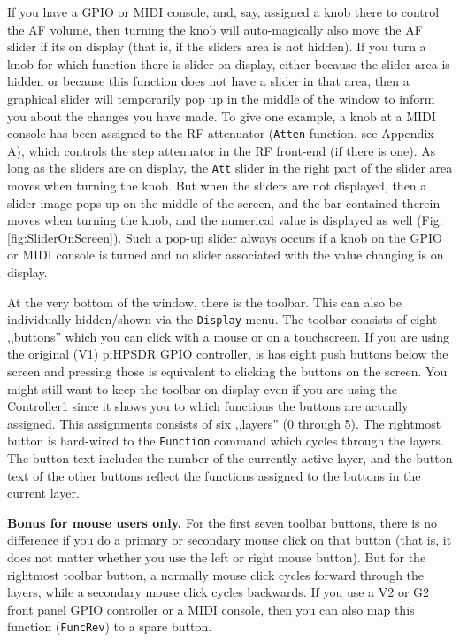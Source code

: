 \documentclass[12pt]{book}
\def\rett#1{\texttt{\color{red}#1}}
\def\bltt#1{\texttt{\color{blue}#1}}
\def\pH{pi\-HPSDR\xspace}
\begin{document}
If you have a GPIO or  MIDI  console, and, say, assigned
a knob there to control the AF volume, then turning the
knob will auto-magically also move the AF slider if its
on display (that is, if the sliders area is not hidden).
If you turn a knob for which function there is slider
on display, either because the slider area is hidden or
because this function does not have a slider in that area,
then a graphical slider will temporarily pop up in the
middle of the window to inform you about the changes
you have  made. To give one example, a knob at a
MIDI console has been assigned to the RF attenuator (\bltt{Atten}
function, see Appendix A), which controls the step
attenuator in the RF front-end (if there is one). As long
as the  sliders  are  on display, the \rett{Att} slider
in the right part of the slider area moves when turning
the knob. But when the sliders are not displayed, then a slider image
pops up  on the middle of the screen, and the
bar contained therein moves when turning the knob,
and the numerical value is displayed as well (Fig. \ref{fig:SliderOnScreen}).
Such a pop-up slider always occurs if a knob on the GPIO or MIDI
console is turned and no slider associated with the value changing is
on display.

At the very bottom of the window, there is the toolbar. This can also be
individually hidden/shown via the \bltt{Display} menu. The toolbar consists
of eight ,,buttons'' which you can click with a mouse or on a touchscreen.
If you are using the original (V1) \pH GPIO controller, is has eight
push buttons below the screen and pressing those is equivalent to clicking
the buttons on the screen. You might still want to keep the toolbar on display
even if you are using the Controller1 since it shows you to which functions
the buttons are actually assigned. This assignments consists of six ,,layers''
(0 through 5). The rightmost button is hard-wired to the \bltt{Function}
command which cycles through the layers. The button text includes the
number of the currently active layer, and the button text of the other buttons
reflect the functions assigned to the buttons in the current layer.

\textbf{Bonus for mouse users only.} For the first seven toolbar buttons,
there is no difference if you do a primary or secondary mouse click on that
button (that is, it does not matter whether you use the left or right mouse
button). But for the rightmost toolbar button, a normally mouse click cycles
forward through the layers, while a secondary mouse click cycles backwards.
If you use a V2 or G2 front panel GPIO controller or a MIDI console, then you
can also map this function (\bltt{FuncRev}) to a spare button.
\end{document}
